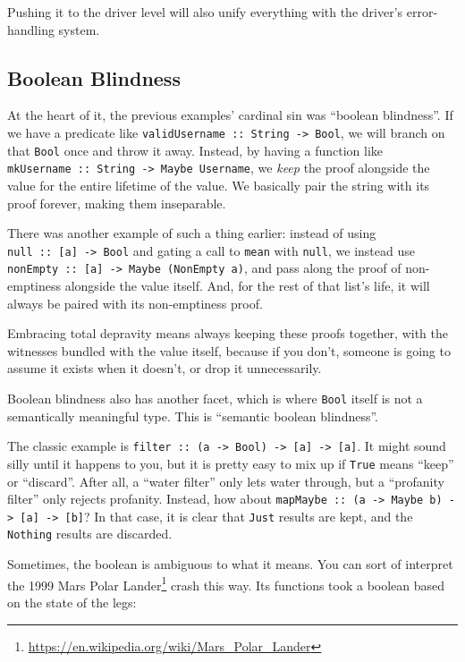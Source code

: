 \documentclass[]{article}
\renewcommand{\href}[2]{#2\footnote{\url{#1}}}
\begin{document}
Pushing it to the driver level will also unify everything with the driver's
error-handling system.

\subsection{Boolean Blindness}\label{boolean-blindness}

At the heart of it, the previous examples' cardinal sin was ``boolean
blindness''. If we have a predicate like
\texttt{validUsername\ ::\ String\ -\textgreater{}\ Bool}, we will branch on
that \texttt{Bool} once and throw it away. Instead, by having a function like
\texttt{mkUsername\ ::\ String\ -\textgreater{}\ Maybe\ Username}, we
\emph{keep} the proof alongside the value for the entire lifetime of the value.
We basically pair the string with its proof forever, making them inseparable.

There was another example of such a thing earlier: instead of using
\texttt{null\ ::\ {[}a{]}\ -\textgreater{}\ Bool} and gating a call to
\texttt{mean} with \texttt{null}, we instead use
\texttt{nonEmpty\ ::\ {[}a{]}\ -\textgreater{}\ Maybe\ (NonEmpty\ a)}, and pass
along the proof of non-emptiness alongside the value itself. And, for the rest
of that list's life, it will always be paired with its non-emptiness proof.

Embracing total depravity means always keeping these proofs together, with the
witnesses bundled with the value itself, because if you don't, someone is going
to assume it exists when it doesn't, or drop it unnecessarily.

Boolean blindness also has another facet, which is where \texttt{Bool} itself is
not a semantically meaningful type. This is ``semantic boolean blindness''.

The classic example is
\texttt{filter\ ::\ (a\ -\textgreater{}\ Bool)\ -\textgreater{}\ {[}a{]}\ -\textgreater{}\ {[}a{]}}.
It might sound silly until it happens to you, but it is pretty easy to mix up if
\texttt{True} means ``keep'' or ``discard''. After all, a ``water filter'' only
lets water through, but a ``profanity filter'' only rejects profanity. Instead,
how about
\texttt{mapMaybe\ ::\ (a\ -\textgreater{}\ Maybe\ b)\ -\textgreater{}\ {[}a{]}\ -\textgreater{}\ {[}b{]}}?
In that case, it is clear that \texttt{Just} results are kept, and the
\texttt{Nothing} results are discarded.

Sometimes, the boolean is ambiguous to what it means. You can sort of interpret
the \href{https://en.wikipedia.org/wiki/Mars_Polar_Lander}{1999 Mars Polar
Lander} crash this way. Its functions took a boolean based on the state of the
legs:
\end{document}
